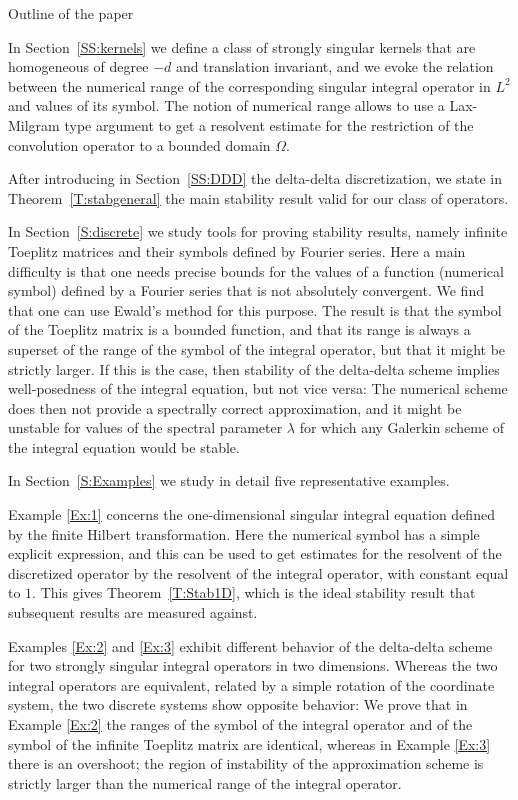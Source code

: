 \documentclass[12pt]{amsart}
\makeatletter
\def\subsection{\@startsection{section}{1}%
  \z@{1.2\linespacing\@plus\linespacing}{.5\linespacing}%
  {\normalfont\scshape\centering}}
\def\subsection{\@startsection{subsection}{2}%
  \z@{0.9\linespacing\@plus.7\linespacing}{-.5em}%
  {\normalfont\bfseries}}
\theoremstyle{definition}
\theoremstyle{remark}
\numberwithin{equation}{section}
\makeatother
\begin{document}
\subsection{Outline of the paper}\label{SS:outline}\ 

In Section~\ref{SS:kernels} we define a class of strongly singular kernels that are homogeneous of degree $-d$ and translation invariant, and we evoke the relation between the numerical range of the corresponding singular integral operator in $L^{2}$ and values of its symbol. The notion of numerical range allows to use a Lax-Milgram type argument to get a resolvent estimate for the restriction of the convolution operator to a bounded domain $\Omega$.

After introducing in Section~\ref{SS:DDD} the delta-delta discretization, we state in Theorem~\ref{T:stabgeneral} the main stability result valid for our class of operators. 

In Section~\ref{S:discrete} we study tools for proving stability results, namely infinite Toeplitz matrices and their symbols defined by Fourier series. Here a main difficulty is that one needs precise bounds for the values of a function (numerical symbol) defined by a Fourier series that is not absolutely convergent. We find that one can use Ewald's method for this purpose.  
The result is that the symbol of the Toeplitz matrix is a bounded function, and that its range is always a superset of the range of the symbol of the integral operator, but that it might be strictly larger.
If this is the case, then stability of the delta-delta scheme implies well-posedness of the integral equation, but not vice versa: The numerical scheme does then not provide a spectrally correct approximation, and it might be unstable for values of the spectral parameter $\lambda$ for which any Galerkin scheme of the integral equation would be stable.

In Section~\ref{S:Examples} we study in detail five representative examples. 

Example \ref{Ex:1} concerns the one-dimensional singular integral equation defined by the finite Hilbert transformation. Here the numerical symbol has a simple explicit expression, and this can be used to get estimates for the resolvent of the discretized operator by the resolvent of the integral operator, with constant equal to $1$. This gives Theorem~\ref{T:Stab1D}, which is the ideal stability result that subsequent results are measured against. 

Examples \ref{Ex:2} and \ref{Ex:3} exhibit different behavior of the delta-delta scheme for two strongly singular integral operators in two dimensions. Whereas the two integral operators are equivalent, related by a simple rotation of the coordinate system, the two discrete systems show opposite behavior: We prove that in Example \ref{Ex:2} the ranges of the symbol of the integral operator and of the symbol of the infinite Toeplitz matrix are identical, whereas in Example \ref{Ex:3} there is an overshoot; the region of instability of the approximation scheme is strictly larger than the numerical range of the integral operator. 
\end{document}
